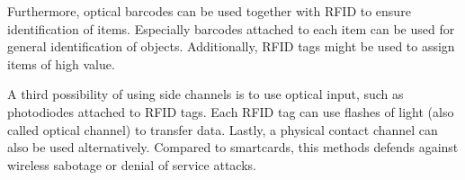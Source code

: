 Furthermore, optical barcodes can be used together with RFID to ensure identification of items. Especially barcodes attached to each item can be used for general identification of objects. Additionally, RFID tags might be used to assign items of high value.

A third possibility of using side channels is to use optical input, such as photodiodes attached to RFID tags. Each RFID tag can use flashes of light (also called optical channel) to transfer data.   
Lastly, a physical contact channel can also be used alternatively. Compared to smartcards, this methods defends against wireless sabotage or denial of service attacks.
